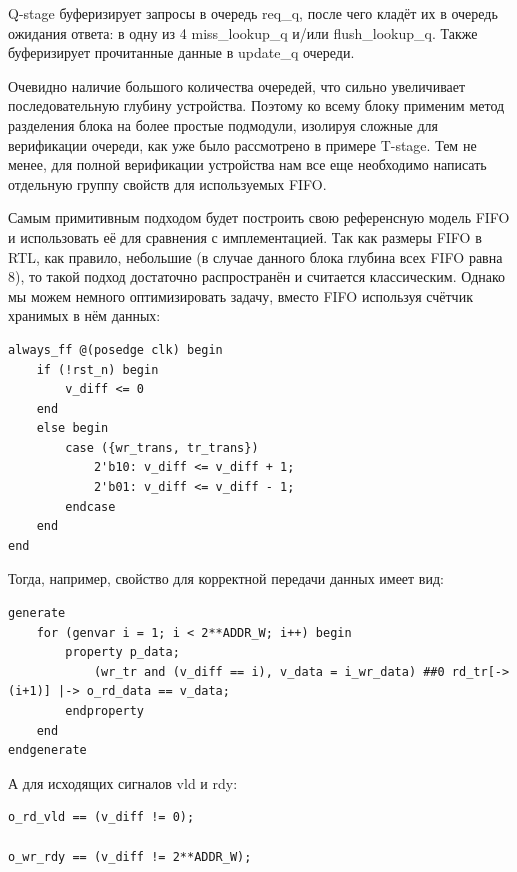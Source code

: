 Q-stage буферизирует запросы в очередь req\_q, после чего кладёт их в очередь ожидания ответа: в одну из 4 miss\_lookup\_q и/или flush\_lookup\_q. Также буферизирует прочитанные данные в update\_q очереди. 

Очевидно наличие большого количества очередей, что сильно увеличивает последовательную глубину устройства. Поэтому ко всему блоку применим метод разделения блока на более простые подмодули, изолируя сложные для верификации очереди, как уже было рассмотрено в примере T-stage. Тем не менее, для полной верификации устройства нам все еще необходимо написать отдельную группу свойств для используемых FIFO.

Самым примитивным подходом будет построить свою референсную модель FIFO и использовать её для сравнения с имплементацией. Так как размеры FIFO в RTL, как правило, небольшие (в случае данного блока глубина всех FIFO равна 8), то такой подход достаточно распространён и считается классическим\cite{sva_handbook}. Однако мы можем немного оптимизировать задачу, вместо FIFO используя счётчик хранимых в нём данных: \newline 

\begin{minipage}{\textwidth}
\begin{lstlisting}
always_ff @(posedge clk) begin 
    if (!rst_n) begin
        v_diff <= 0
    end
    else begin
        case ({wr_trans, tr_trans})
            2'b10: v_diff <= v_diff + 1;
            2'b01: v_diff <= v_diff - 1;
        endcase
    end
end
\end{lstlisting}
\end{minipage}

Тогда, например, свойство для корректной передачи данных имеет вид: \newline

\begin{minipage}{\textwidth}
\begin{lstlisting}
generate
    for (genvar i = 1; i < 2**ADDR_W; i++) begin
        property p_data;
            (wr_tr and (v_diff == i), v_data = i_wr_data) ##0 rd_tr[->(i+1)] |-> o_rd_data == v_data;
        endproperty
    end
endgenerate 
\end{lstlisting}
\end{minipage}

А для исходящих сигналов vld и rdy: \newline

\begin{minipage}{\textwidth}
\begin{lstlisting}
o_rd_vld == (v_diff != 0);

o_wr_rdy == (v_diff != 2**ADDR_W);
\end{lstlisting}
\end{minipage}

